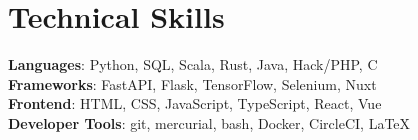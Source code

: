 \documentclass[letterpaper,11pt]{article}
\begin{document}
%
\section{Technical Skills}
 \begin{itemize}[leftmargin=0.15in, label={}]
    \small{\item{
     \textbf{Languages}{: Python, SQL, Scala, Rust, Java, Hack/PHP, C} \\
     \textbf{Frameworks}{: FastAPI, Flask, TensorFlow, Selenium, Nuxt} \\
     \textbf{Frontend}{: HTML, CSS, JavaScript, TypeScript, React, Vue} \\
     \textbf{Developer Tools}{: git, mercurial, bash, Docker, CircleCI, \LaTeX}
     
    }}
 \end{itemize}


\end{document}
